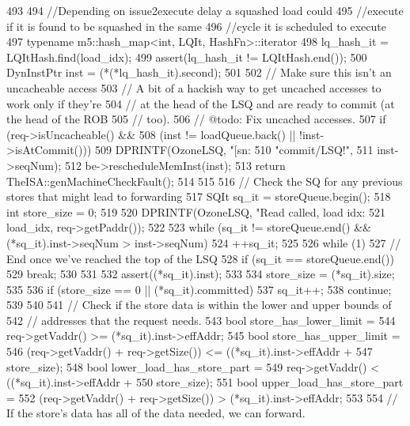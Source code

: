 \begin{DoxyCode}
493 {
494     //Depending on issue2execute delay a squashed load could
495     //execute if it is found to be squashed in the same
496     //cycle it is scheduled to execute
497     typename m5::hash_map<int, LQIt, HashFn>::iterator
498         lq_hash_it = LQItHash.find(load_idx);
499     assert(lq_hash_it != LQItHash.end());
500     DynInstPtr inst = (*(*lq_hash_it).second);
501 
502     // Make sure this isn't an uncacheable access
503     // A bit of a hackish way to get uncached accesses to work only if they're
504     // at the head of the LSQ and are ready to commit (at the head of the ROB
505     // too).
506     // @todo: Fix uncached accesses.
507     if (req->isUncacheable() &&
508         (inst != loadQueue.back() || !inst->isAtCommit())) {
509         DPRINTF(OzoneLSQ, "[sn:%
510                 "commit/LSQ!\n",
511                 inst->seqNum);
512         be->rescheduleMemInst(inst);
513         return TheISA::genMachineCheckFault();
514     }
515 
516     // Check the SQ for any previous stores that might lead to forwarding
517     SQIt sq_it = storeQueue.begin();
518     int store_size = 0;
519 
520     DPRINTF(OzoneLSQ, "Read called, load idx: %
521             load_idx, req->getPaddr());
522 
523     while (sq_it != storeQueue.end() && (*sq_it).inst->seqNum > inst->seqNum)
524         ++sq_it;
525 
526     while (1) {
527         // End once we've reached the top of the LSQ
528         if (sq_it == storeQueue.end()) {
529             break;
530         }
531 
532         assert((*sq_it).inst);
533 
534         store_size = (*sq_it).size;
535 
536         if (store_size == 0 || (*sq_it).committed) {
537             sq_it++;
538             continue;
539         }
540 
541         // Check if the store data is within the lower and upper bounds of
542         // addresses that the request needs.
543         bool store_has_lower_limit =
544             req->getVaddr() >= (*sq_it).inst->effAddr;
545         bool store_has_upper_limit =
546             (req->getVaddr() + req->getSize()) <= ((*sq_it).inst->effAddr +
547                                                    store_size);
548         bool lower_load_has_store_part =
549             req->getVaddr() < ((*sq_it).inst->effAddr +
550                                store_size);
551         bool upper_load_has_store_part =
552             (req->getVaddr() + req->getSize()) > (*sq_it).inst->effAddr;
553 
554         // If the store's data has all of the data needed, we can forward.
}}
\end{DoxyCode}
